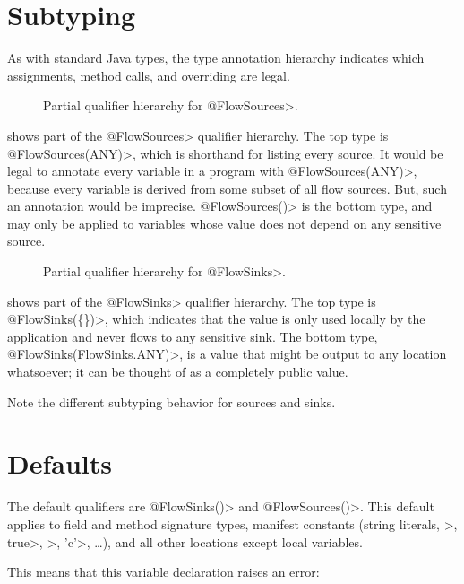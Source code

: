 \section{Subtyping}

As with standard Java types, the type annotation hierarchy indicates which
assignments, method calls, and overriding are legal.


\begin{figure}
\caption{Partial qualifier hierarchy for \<@FlowSources>.}
\label{fig:flowsources-hierarchy}
\end{figure}

 shows part of the \<@FlowSources>
qualifier hierarchy.  The top type is \<@FlowSources(ANY)>, which is
shorthand for listing every source.  It would be legal to annotate every
variable in a program with \<@FlowSources(ANY)>, because every variable is
derived from some subset of all flow sources.  But, such an annotation
would be imprecise.  \<@FlowSources({})> is the bottom type, and may only
be applied to variables whose value does not depend on any sensitive
source.


\begin{figure}
\caption{Partial qualifier hierarchy for \<@FlowSinks>.}
\label{fig:flowsinks-hierarchy}
\end{figure}

 shows part of the \<@FlowSinks>
qualifier hierarchy.  The top type is \<@FlowSinks(\{\})>, which indicates
that the value is only used locally by the application and never flows to
any sensitive sink.  The bottom type, \<@FlowSinks(FlowSinks.ANY)>, is a
value that might be output to any location whatsoever; it can be thought of
as a completely public value.

Note the different subtyping behavior for sources and sinks.


\section{Defaults}

The default qualifiers are \<@FlowSinks({})> and \<@FlowSources({})>.  This
default applies to field and method signature types, manifest constants
(string literals, >, \<true>, >, \<'c'>,
\ldots), and all other locations except local variables.

This means that this variable declaration raises an error:

